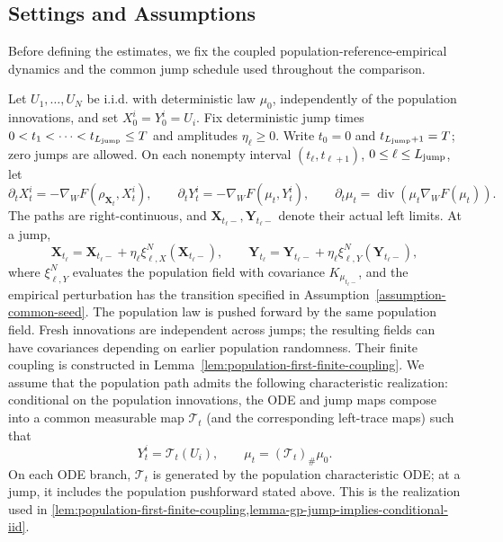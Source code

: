 \subsection{Settings and Assumptions}
\label{subsec:general-argument-bound-settings}

Before defining the estimates, we fix the coupled population-reference-empirical
dynamics and the common jump schedule used throughout the comparison.

\begin{definition}
\label{definition-ode-and-jump}
Let $U_1,\ldots,U_N$ be i.i.d. with deterministic law $\mu_0$, independently of
the population innovations, and set $X_0^i=Y_0^i=U_i$. Fix deterministic jump
times $0<t_1<\cdots<t_{L_{\mathrm{jump}}}\le T$ and amplitudes $\eta_\ell\ge0$.
Write $t_0=0$ and $t_{L_{\mathrm{jump}}+1}=T$; zero jumps are allowed.
On each nonempty interval $(t_\ell,t_{\ell+1})$, $0\le\ell\le L_{\mathrm{jump}}$, let
\[
\partial_tX_t^i=-\nabla_WF(\rho_{\mathbf X_t},X_t^i),\qquad
\partial_tY_t^i=-\nabla_WF(\mu_t,Y_t^i),\qquad
\partial_t\mu_t=\operatorname{div}(\mu_t\nabla_WF(\mu_t)).
\]
The paths are right-continuous, and $\mathbf X_{t_\ell-},\mathbf Y_{t_\ell-}$
denote their actual left limits. At a jump,
\begin{equation}
\label{eq:jump-dynamics-XY}
\mathbf X_{t_\ell}=\mathbf X_{t_\ell-}+\eta_\ell\xi_{\ell,X}^N(\mathbf X_{t_\ell-}),
\qquad
\mathbf Y_{t_\ell}=\mathbf Y_{t_\ell-}+\eta_\ell\xi_{\ell,Y}^N(\mathbf Y_{t_\ell-}),
\end{equation}
where $\xi_{\ell,Y}^N$ evaluates the population field with covariance
$K_{\mu_{t_\ell-}}$, and the empirical perturbation has the transition specified
in Assumption~\ref{assumption-common-seed}. The population law is pushed forward
by the same population field. Fresh innovations are independent across jumps;
the resulting fields can have covariances depending on earlier population
randomness. Their finite coupling is constructed in
Lemma~\ref{lem:population-first-finite-coupling}.
We assume that the population path admits the following characteristic
realization: conditional on
the population innovations, the ODE and jump maps compose into a common
measurable map \(\mathcal T_t\) (and the corresponding left-trace maps) such that
\[
Y_t^i=\mathcal T_t(U_i),\qquad
\mu_t=(\mathcal T_t)_\#\mu_0.
\]
On each ODE branch, \(\mathcal T_t\) is generated by the population
characteristic ODE; at a jump, it includes the population pushforward stated
above. This is the realization used in
\cref{lem:population-first-finite-coupling,lemma-gp-jump-implies-conditional-iid}.
\end{definition}

